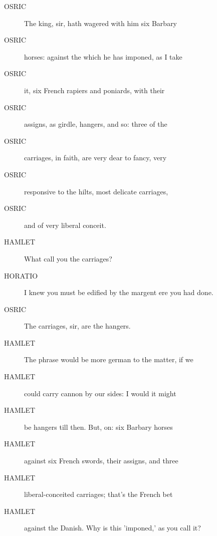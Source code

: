 \documentclass{article}
\begin{document}
\begin{description}
            
\item[OSRIC] The king, sir, hath wagered with him six Barbary
\item[OSRIC] horses: against the which he has imponed, as I take
\item[OSRIC] it, six French rapiers and poniards, with their
\item[OSRIC] assigns, as girdle, hangers, and so: three of the
\item[OSRIC] carriages, in faith, are very dear to fancy, very
\item[OSRIC] responsive to the hilts, most delicate carriages,
\item[OSRIC] and of very liberal conceit.
\end{description}
          
\begin{description}
            
\item[HAMLET] What call you the carriages?
\end{description}
          
\begin{description}
            
\item[HORATIO] I knew you must be edified by the margent ere you had done.
\end{description}
          
\begin{description}
            
\item[OSRIC] The carriages, sir, are the hangers.
\end{description}
          
\begin{description}
            
\item[HAMLET] The phrase would be more german to the matter, if we
\item[HAMLET] could carry cannon by our sides: I would it might
\item[HAMLET] be hangers till then. But, on: six Barbary horses
\item[HAMLET] against six French swords, their assigns, and three
\item[HAMLET] liberal-conceited carriages; that's the French bet
\item[HAMLET] against the Danish. Why is this 'imponed,' as you call it?
\end{description}
          
\end{document}
